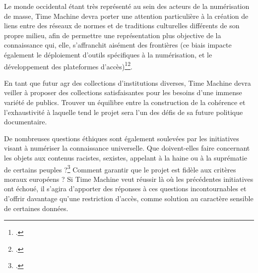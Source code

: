 Le monde occidental étant très représenté au sein des acteurs de la numérisation de masse, Time Machine devra porter une attention particulière à la création de liens entre des réseaux de normes et de traditions culturelles différents de son propre milieu, afin de permettre une représentation plus objective de la connaissance qui, elle, s'affranchit aisément des frontières (ce biais impacte également le déploiement d'outils spécifiques à la numérisation, et le développement des plateformes d'accès)\footcite{weiss_examining_2016}\footcite{jones_public_2017}. 

En tant que futur \gls{agr} des collections d'institutions diverses, Time Machine devra veiller à proposer des collections satisfaisantes pour les besoins d'une immense variété de publics. Trouver un équilibre entre la construction de la cohérence et l'exhaustivité à laquelle tend le projet sera l'un des défis de sa future politique documentaire.

De nombreuses questions éthiques sont également soulevées par les initiatives visant à numériser la connaissance universelle. Que doivent-elles faire concernant les objets aux contenus racistes, sexistes, appelant à la haine ou à la suprématie de certains peuples ?\footcite{weiss_examining_2016} Comment garantir que le projet est fidèle aux critères moraux européens ? Si Time Machine veut réussir là où les précédentes initiatives ont échoué, il s'agira d'apporter des réponses à ces questions incontournables et d'offrir davantage qu'une restriction d'accès, comme solution au caractère sensible de certaines données.
\newpage
